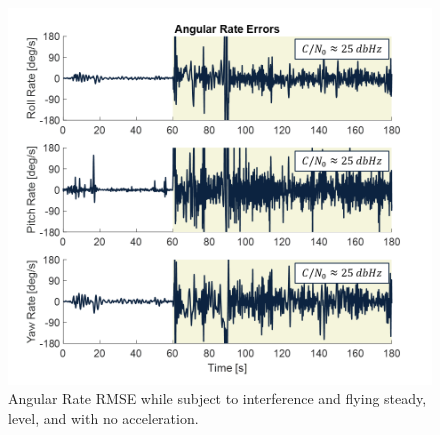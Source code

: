 \begin{figure}[!ht]
    \centering
    \includegraphics[width=0.75\linewidth]{Figures/Results/StraightAngularErrors.png}
    \caption{Angular Rate RMSE while subject to interference and flying steady, level, and with no acceleration.}\label{fig:SLUF}
\end{figure}


